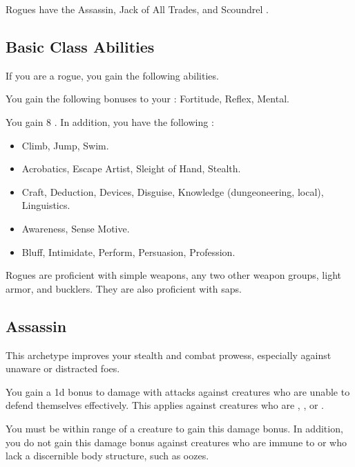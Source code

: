      Rogues have the Assassin, Jack of All Trades, and Scoundrel .

    \subsection{Basic Class Abilities}
        If you are a rogue, you gain the following abilities.

        You gain the following bonuses to your :  Fortitude,  Reflex,  Mental.

        You gain 8 .
        In addition, you have the following :
        \begin{itemize}
            \item {} Climb, Jump, Swim.
            \item {} Acrobatics, Escape Artist, Sleight of Hand, Stealth.
            \item {} Craft, Deduction, Devices, Disguise, Knowledge (dungeoneering, local), Linguistics.
            \item {} Awareness, Sense Motive.
            \item {} Bluff, Intimidate, Perform, Persuasion, Profession.
        \end{itemize}

        Rogues are proficient with simple weapons, any two other weapon groups, light armor, and bucklers.
        They are also proficient with saps.

    \subsection{Assassin}
        This archetype improves your stealth and combat prowess, especially against unaware or distracted foes.

         You gain a \plus1d bonus to damage with attacks against creatures who are unable to defend themselves effectively.
        This applies against creatures who are \unaware, , or .

        You must be within \rngclose range of a creature to gain this damage bonus.
        In addition, you do not gain this damage bonus against creatures who are immune to  or who lack a discernible body structure, such as oozes.

